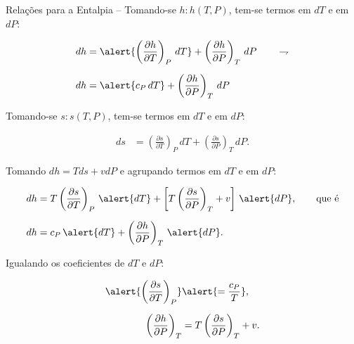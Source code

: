     \begin{frame}[allowframebreaks]{Relações para a Entalpia --}\vspace*{-0em}
        Tomando-se \alert{$h\!:\!h(T, P)$}, tem-se termos em \alert{$dT$} e em \alert{$dP$}:

        \begin{align*}
            dh  &= 
                \alert{\left(\frac{\partial h}{\partial T}\right)_P\,dT} +
                \left(\frac{\partial h}{\partial P}\right)_T\,dP
            \qquad\rightharpoondown
            \\[\medskipamount]
            dh  &=
                \alert{c_P\,dT} +
                \left(\frac{\partial h}{\partial P}\right)_T\,dP
        \end{align*}

        Tomando-se \alert{$s\!:\!s(T, P)$}, tem-se termos em \alert{$dT$} e em \alert{$dP$}:

        \begin{align*}
            ds  &= 
                \left(\frac{\partial s}{\partial T}\right)_P\,dT +
                \left(\frac{\partial s}{\partial P}\right)_T\,dP.
        \end{align*}

        \pagebreak
        Tomando \alert{$dh = Tds + vdP$} e agrupando termos em \alert{$dT$} e em \alert{$dP$}:

        \begin{align*}
            dh  &=
                T\left(\frac{\partial s}{\partial T}\right)_P\,\alert{dT} +
                \left[
                    T\left(\frac{\partial s}{\partial P}\right)_T + v
                \right]\,\alert{dP},
            \qquad\mbox{que é}
            \\[\medskipamount]
            dh  &=
                c_P\,\alert{dT} +
                \left(\frac{\partial h}{\partial P}\right)_T\,\alert{dP}.
        \end{align*}

        \pagebreak
        Igualando os coeficientes de \alert{$dT$} e \alert{$dP$}:

        \begin{align*}
            \alert{\left(\frac{\partial s}{\partial T}\right)_P}
            &\alert{= \frac{c_P}{T}},
            \\[\medskipamount]
            \left(\frac{\partial h}{\partial P}\right)_T
            &= T\left(\frac{\partial s}{\partial P}\right)_T + v.
        \end{align*}


\end{frame}
